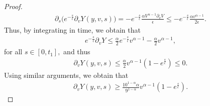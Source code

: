 \documentclass[11pt]{article}
\numberwithin{equation}{section}
\begin{document}
\begin{proof}
\begin{align*}
             \partial_{s}\big(e^{-\frac{s}{\epsilon}}\partial_{v}Y(y,v,s)\big)=-e^{-\frac{s}{\epsilon}}\frac{\alpha V^{\alpha-1}\partial_{v}V}{\epsilon}\leq -e^{-\frac{s}{\epsilon}}\frac{\alpha v^{\alpha-1}}{2\epsilon}.
     \end{align*}
     Thus, by integrating in time, we obtain that
     \begin{align*}
         e^{-\frac{s}{\epsilon}}\partial_{v}Y\leq \frac{\alpha}{2} e^{-\frac{s}{\epsilon}}v^{\alpha-1}-\frac{\alpha}{2} v^{\alpha-1},
     \end{align*}
     for all $s\in[0,t_{1}],$ and thus
     \begin{align*}
         \partial_{v}Y(y,v,s)\leq \frac{\alpha}{2} v^{\alpha-1}(1-e^{\frac{s}{\epsilon}})\leq 0.
     \end{align*}
Using similar arguments, we obtain that
\begin{align}\label{exponential bound for der y}
    \partial_{v}Y(y,v,s)\geq \frac{10^{1-\alpha}\alpha}{9^{1-\alpha}} v^{\alpha-1}(1-e^{\frac{s}{\epsilon}}).
\end{align}


\end{proof}
\end{document}
